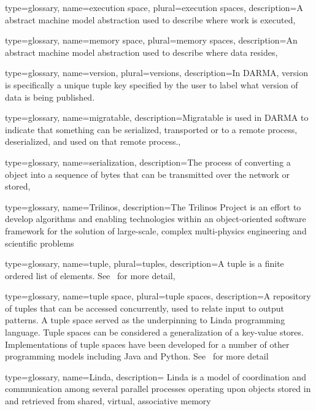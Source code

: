{
  type=glossary,
  name={execution space},
  plural={execution spaces},
  description={A \gls{abstract machine model} abstraction used to describe where work is executed},
}

{
  type=glossary,
  name={memory space},
  plural={memory spaces},
  description={An \gls{abstract machine model} abstraction used to describe
    where data resides},
}

{
  type=glossary,
  name=version,
  plural=versions,
  description={In DARMA, version is specifically a unique tuple key specified by the user to label what
    version of data is being \gls{publish}ed.}
}

{
  type=glossary,
  name=migratable,
  description={Migratable is used in DARMA to indicate that something can be serialized,
   transported or to a remote process, deserialized, and used on that remote process.},
}

{
  type=glossary,
  name=serialization,
  description={The process of converting a \CC{} object into a sequence of bytes that
    can be transmitted over the network or stored}, 
}



{
  type=glossary,
  name=Trilinos,
  description={The Trilinos Project is an effort to develop algorithms and
    enabling technologies within an object-oriented software framework for the
      solution of large-scale, complex multi-physics engineering and scientific
      problems~\cite{trilinos}}
}

{
  type={glossary},
  name={tuple},
  plural={tuples},
  description={A tuple is a finite ordered list of elements.  See~\cite{tuple}
  for more detail},
}

{
  type={glossary},
  name={tuple space},
  plural={tuple spaces},
  description={A repository of \glspl{tuple} that can be
  accessed concurrently, used to relate input to output patterns. A tuple
  space served as the underpinning to \gls{Linda} \gls{programming
  language}. Tuple spaces can be considered a generalization of a
  \glspl{key-value store}. Implementations of tuple spaces have 
  been developed for a number of other
  programming models including Java and Python.  See~\cite{tupleSpace} for
  more detail} 
}

{
  type={glossary},
  name={Linda},
  description={ Linda is a model of coordination and communication among several parallel
      processes operating upon objects stored in and retrieved from shared,
    virtual, associative memory~\cite{Linda}}
}



